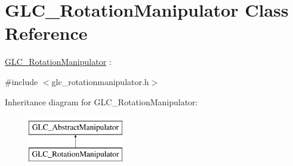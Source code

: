 \hypertarget{class_g_l_c___rotation_manipulator}{\section{G\-L\-C\-\_\-\-Rotation\-Manipulator Class Reference}
\label{class_g_l_c___rotation_manipulator}
}


\hyperlink{class_g_l_c___rotation_manipulator}{G\-L\-C\-\_\-\-Rotation\-Manipulator} \-:  




{\ttfamily \#include $<$glc\-\_\-rotationmanipulator.\-h$>$}

Inheritance diagram for G\-L\-C\-\_\-\-Rotation\-Manipulator\-:\begin{figure}[H]
\begin{center}
\leavevmode
\includegraphics[height=2.000000cm]{class_g_l_c___rotation_manipulator}
\end{center}
\end{figure}
